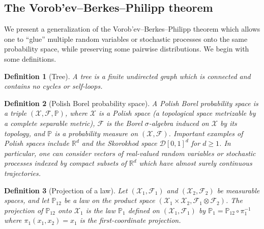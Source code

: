 \documentclass[11pt,lof]{puthesis}
\renewcommand{\P}{\ensuremath{\mathbb{P}}}
\newcommand{\R}{\ensuremath{\mathbb{R}}}
\newcommand{\cF}{\ensuremath{\mathcal{F}}}
\newcommand{\cX}{\ensuremath{\mathcal{X}}}
\newcommand{\cD}{\ensuremath{\mathcal{D}}}
\theoremstyle{break}
\newtheorem{definition}{Definition}[section]
\theoremstyle{proof}
\begin{document}
\subsection{The Vorob'ev--Berkes--Philipp theorem}

We present a generalization of the Vorob'ev--Berkes--Philipp theorem
\citep{dudley1999uniform}
which allows one to ``glue'' multiple random variables
or stochastic processes onto the same probability space,
while preserving some pairwise distributions.
We begin with some definitions.

\begin{definition}[Tree]
  A \emph{tree} is a finite undirected graph which is connected and contains no
  cycles or self-loops.
\end{definition}

\begin{definition}[Polish Borel probability space]
  A \emph{Polish Borel probability space}
  is a triple $(\cX, \cF, \P)$,
  where $\cX$ is a Polish space
  (a topological space metrizable by a complete separable metric),
  $\cF$ is the Borel $\sigma$-algebra induced on $\cX$ by its topology,
  and $\P$ is a probability measure on $(\cX, \cF)$.
  Important examples of Polish spaces include $\R^d$ and
  the Skorokhod space $\cD[0,1]^d$ for $d \geq 1$.
  In particular,
  one can consider vectors of real-valued random variables
  or stochastic processes indexed by
  compact subsets of $\R^d$ which have
  almost surely continuous trajectories.
\end{definition}

\begin{definition}[Projection of a law]
  Let $(\cX_1, \cF_1)$ and $(\cX_2, \cF_2)$
  be measurable spaces, and
  let $\P_{12}$ be a law on the
  product space
  $(\cX_1 \times \cX_2, \cF_1 \otimes \cF_2)$.
  The \emph{projection} of $\P_{12}$
  onto $\cX_1$ is the law
  $\P_1$ defined on $(\cX_1, \cF_1)$
  by $\P_1 = \P_{12} \circ \pi_1^{-1}$
  where $\pi_1(x_1, x_2) = x_1$
  is the first-coordinate projection.
\end{definition}
\end{document}
